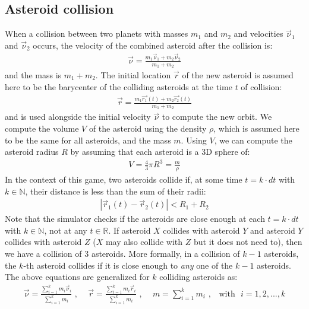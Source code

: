 \begin{appendices}
\subsection{Asteroid collision}

When a collision between two planets with masses $m_1$ and $m_2$ and velocities $\vec{\nu}_1$ and $\vec{\nu}_2$ occurs, the velocity of the combined asteroid after the collision is:
\begin{eqnarray*}
\vec{\nu} = \frac{m_1\vec{\nu}_1 + m_2\vec{\nu}_2}{m_1 + m_2}
\end{eqnarray*}
and the mass is $m_1 + m_2$. The initial location $\vec{r}$ of the new asteroid is assumed here to be the barycenter of the colliding asteroids at the time $t$ of collision:
\begin{eqnarray*}
\vec{r} = \frac{m_1 \vec{r_1}(t) + m_2 \vec{r_2}(t)}{m_1 + m_2}
\end{eqnarray*}
and is used alongside the initial velocity $\vec{\nu}$ to compute the new orbit. We compute the volume $V$ of the asteroid using the density $\rho$, which is assumed here to be the same for all asteroids, and the mass $m$. Using $V$, we can compute the asteroid radius $R$ by assuming that each asteroid is a 3D sphere of:
\begin{eqnarray*}
V = \frac{4}{3}\pi R^3 = \frac{m}{\rho}
\end{eqnarray*}
In the context of this game, two asteroids collide if, at some time $t = k \cdot dt$ with $k \in \mathbb{N}$, their distance is less than the sum of their radii:
\begin{eqnarray*}
|\vec{r}_1(t) - \vec{r}_2(t)| < R_1 + R_2
\end{eqnarray*}
Note that the simulator checks if the asteroids are close enough at each $t = k \cdot dt$ with $k \in \mathbb{N}$, not at any $t \in \mathbb{R}$. If asteroid $X$ collides with asteroid $Y$ and asteroid $Y$ collides with asteroid $Z$ ($X$ may also collide with $Z$ but it does not need to), then we have a collision of 3 asteroids. More formally, in a collision of $k-1$ asteroids, the $k$-th asteroid collides if it is close enough to \emph{any} one of the $k-1$ asteroids. The above equations are generalized for $k$ colliding asteroids as:
\begin{eqnarray*}
\vec{\nu} = \frac{\sum_{i=1}^k m_i\vec{\nu}_i}{\sum_{i=1}^k m_i} \text{~,~~~~}
\vec{r} = \frac{\sum_{i=1}^k m_i\vec{r}_i}{\sum_{i=1}^k m_i} \text{~,~~~~}
m = \sum_{i=1}^k m_i \text{~,~~~with~~} i = 1,2,...,k
\end{eqnarray*}


\end{appendices}

